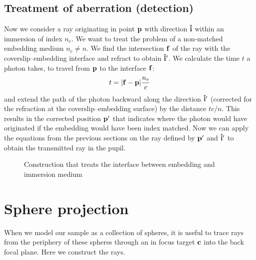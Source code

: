 \subsection{Treatment of aberration (detection)}
\label{sec:ray-aberration}
Now we consider a ray originating in point $\mathbf{p}$ with direction $\mathbf{\hat{i}}$
within an immersion of index $n_e$. We want to treat the problem of a
non-matched embedding medium $n_e\not=n$. We find the intersection
$\mathbf{f}$ of the ray with the coverslip--embedding interface and refract to
obtain $\mathbf{\hat{i}}'$. We calculate the time $t$ a photon takes, to travel from
$\mathbf{p}$ to the interface $\mathbf{f}$:
\begin{align}
  t = \mathopen| \mathbf{f} - \mathbf{p} \mathclose| \frac{n_e}{c}
\end{align}
and extend the path of the photon backward along the direction $\mathbf{\hat{i}}'$
(corrected for the refraction at the coverslip--embedding surface) by
the distance $tc/n$. This results in the corrected position $\mathbf{p}'$ that
indicates where the photon would have originated if the embedding
would have been index matched.  Now we can apply the equations from
the previous sections on the ray defined by $\mathbf{p}'$ and $\mathbf{\hat{i}}'$ to obtain
the transmitted ray in the pupil.

 \begin{figure}[!hbt]
   \centering
   
   \caption{Construction that treats the interface between embedding
     and immersion medium}
 \end{figure}
\section{Sphere projection}
\label{sec:sphere-projection}
When we model our sample as a collection of spheres, it is useful to
trace rays from the periphery of these spheres through an in focus
target $\mathbf{c}$ into the back focal plane. Here we construct the rays.

